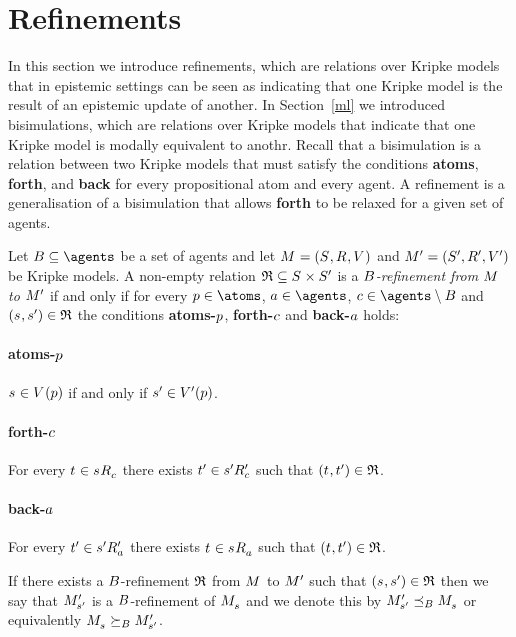 \section{Refinements}\label{rml-refinements}

In this section we introduce refinements, which are relations over Kripke models that in epistemic settings can be seen as indicating that one Kripke model is the result of an epistemic update of another.
In Section~\ref{ml} we introduced bisimulations, which are relations over Kripke models that indicate that one Kripke model is modally equivalent to anothr.
Recall that a bisimulation is a relation between two Kripke models that must satisfy the conditions {\bf atoms}, {\bf forth}, and {\bf back} for every propositional atom and every agent.
A refinement is a generalisation of a bisimulation that allows {\bf forth} to be relaxed for a given set of agents.

\begin{definition}[Refinements]\label{refinements}
Let $\agentsB \subseteq \agents$ be a set of agents and let $\kModelAndTuple$ and $\kModelAndTupleP$ be Kripke models.
A non-empty relation $\refinement \subseteq \kStates \times \kStatesP$ is a {\em $B$-refinement from $\kModel$ to ${M^{\prime}_{}}$} if and only if for every $\atomP \in \atoms$, $\agentA \in \agents$, $\agentC \in \agents \setminus \agentsB$ and $(\kStateS, \kStateSP) \in \refinement$ the conditions {\bf atoms-$p$}, {\bf forth-$c$} and {\bf back-$a$} holds:

\paragraph{atoms-$p$}
$\kStateS \in \kValuation(\atomP)$ if and only if ${s}^{\prime} \in {V^{\prime}}(p)$.

\paragraph{forth-$c$}
For every $\kStateT \in \kSuccessorsC{\kStateS}$ there exists ${t}^{\prime} \in {{s}^{\prime}} {R^{\prime}_{c}}$ such that $(\kStateT, \kStateTP) \in \refinement$.

\paragraph{back-$a$}
For every ${t}^{\prime} \in {{s}^{\prime}} {R^{\prime}_{a}}$ there exists $\kStateT \in \kSuccessorsA{\kStateS}$ such that $(\kStateT, \kStateTP) \in \refinement$.

If there exists a $B$-refinement $\mathfrak{R}$ from $\kModel$ to ${M^{\prime}_{}}$ such that $(\kStateS, \kStateSP) \in \refinement$ then we say that ${M^{\prime}_{{s}^{\prime}}}$ is a $B$-refinement of $\kPModel{\kStateS}$ and we denote this by $\kPModelP{\kStateSP} \refinesBs \kPModel{\kStateS}$ or equivalently $\kPModel{\kStateS} \simulatesBs \kPModelP{\kStateSP}$.
\end{definition}

